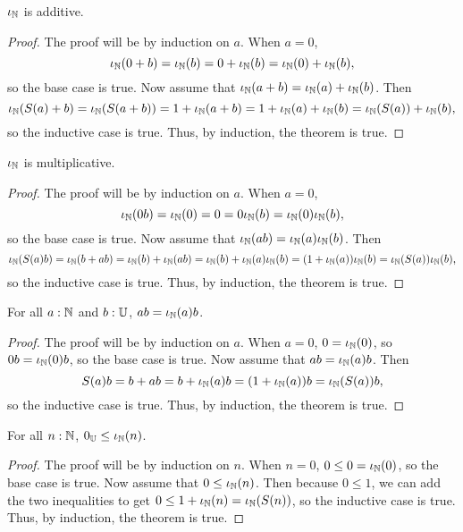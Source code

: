 \documentclass[../math.tex]{subfiles}
\begin{document}
\begin{instance}
    $\iota_{\mathbb{N}}$ is additive.
\end{instance}
\begin{proof}
    The proof will be by induction on $a$.  When $a = 0$,
    \[
        \iota_{\mathbb{N}}(0 + b) = \iota_{\mathbb{N}}(b) = 0 + \iota_{\mathbb{N}}(b) = \iota_{\mathbb{N}}(0) + \iota_{\mathbb{N}}(b),
    \]
    so the base case is true.  Now assume that $\iota_{\mathbb{N}}(a + b) = \iota_{\mathbb{N}}(a) + \iota_{\mathbb{N}}(b)$.
    Then
    \[
        \iota_{\mathbb{N}}(S(a) + b) = \iota_{\mathbb{N}}(S(a + b)) = 1 + \iota_{\mathbb{N}}(a + b) = 1 + \iota_{\mathbb{N}}(a) + \iota_{\mathbb{N}}(b) =
        \iota_{\mathbb{N}}(S(a)) + \iota_{\mathbb{N}}(b),
    \]
    so the inductive case is true.  Thus, by induction, the theorem is true.
\end{proof}

\begin{instance}
    $\iota_{\mathbb{N}}$ is multiplicative.
\end{instance}
\begin{proof}
    The proof will be by induction on $a$.  When $a = 0$,
    \[
        \iota_{\mathbb{N}}(0b) = \iota_{\mathbb{N}}(0) = 0 = 0\iota_{\mathbb{N}}(b) = \iota_{\mathbb{N}}(0)\iota_{\mathbb{N}}(b),
    \]
    so the base case is true.  Now assume that $\iota_{\mathbb{N}}(ab) = \iota_{\mathbb{N}}(a)\iota_{\mathbb{N}}(b)$.
    Then
    \[
        \iota_{\mathbb{N}}(S(a)b) = \iota_{\mathbb{N}}(b + ab) = \iota_{\mathbb{N}}(b) + \iota_{\mathbb{N}}(ab) = \iota_{\mathbb{N}}(b) + \iota_{\mathbb{N}}(a)\iota_{\mathbb{N}}(b) =
        (1 + \iota_{\mathbb{N}}(a)) \iota_{\mathbb{N}}(b) = \iota_{\mathbb{N}}(S(a))\iota_{\mathbb{N}}(b),
    \]
    so the inductive case is true.  Thus, by induction, the theorem is true.
\end{proof}

\begin{theorem}
    For all $a : \mathbb{N}$ and $b : \mathbb{U}$, $ab = \iota_{\mathbb{N}}(a)b$.
\end{theorem}
\begin{proof}
    The proof will be by induction on $a$.  When $a = 0$, $0 = \iota_{\mathbb{N}}(0)$, so $0b =
    \iota_{\mathbb{N}}(0)b$, so the base case is true.  Now assume that $ab = \iota_{\mathbb{N}}(a)b$.  Then
    \[
        S(a)b = b + ab = b + \iota_{\mathbb{N}}(a)b = (1 + \iota_{\mathbb{N}}(a))b = \iota_{\mathbb{N}}(S(a))b,
    \]
    so the inductive case is true.  Thus, by induction, the theorem is true.
\end{proof}

\begin{theorem} \label{from_nat_pos2}
    For all $n : \mathbb{N}$, $0_{\mathbb{U}} \leq \iota_{\mathbb{N}}(n)$.
\end{theorem}
\begin{proof}
    The proof will be by induction on $n$.  When $n = 0$, $0 \leq 0 = \iota_{\mathbb{N}}(0)$,
    so the base case is true.  Now assume that $0 \leq \iota_{\mathbb{N}}(n)$.  Then because $0
    \leq 1$, we can add the two inequalities to get $0 \leq 1 + \iota_{\mathbb{N}}(n) =
    \iota_{\mathbb{N}}(S(n))$, so the inductive case is true.  Thus, by induction, the theorem
    is true.
\end{proof}
\end{document}
